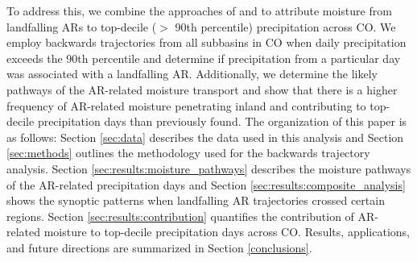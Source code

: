 \documentclass[draft]{agujournal2019}
\begin{document}
To address this, we combine the approaches of  and  to attribute moisture from landfalling ARs to top-decile ($>$ 90th percentile) precipitation across CO. We employ backwards trajectories from all subbasins in CO when daily precipitation exceeds the 90th percentile and determine if precipitation from a particular day was associated with a landfalling AR. Additionally, we determine the likely pathways of the AR-related moisture transport and show that there is a higher frequency of AR-related moisture penetrating inland and contributing to top-decile precipitation days than previously found. The organization of this paper is as follows: Section \ref{sec:data} describes the data used in this analysis and Section \ref{sec:methods} outlines the methodology used for the backwards trajectory analysis. Section \ref{sec:results:moisture_pathways} describes the moisture pathways of the AR-related precipitation days and Section \ref{sec:results:composite_analysis} shows the synoptic patterns when landfalling AR trajectories crossed certain regions. Section \ref{sec:results:contribution} quantifies the contribution of AR-related moisture to top-decile precipitation days across CO. Results, applications, and future directions are summarized in Section \ref{conclusions}. 

\end{document}
